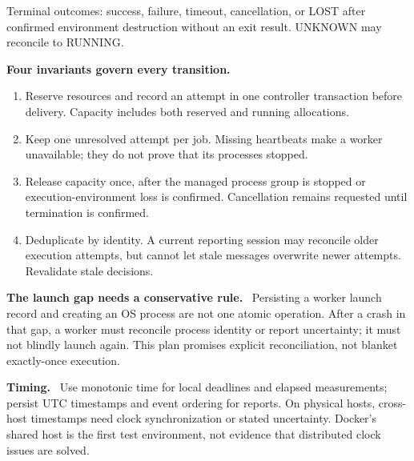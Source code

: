 \documentclass[10pt,letterpaper]{article}
\newcommand{\lead}[1]{\par\vspace{3pt}\textbf{#1}\ }
\begin{document}
\vspace{7pt}
\begin{center}
\end{center}
{\small\color{muted}Terminal outcomes: success, failure, timeout, cancellation, or LOST after
confirmed environment destruction without an exit result. UNKNOWN may reconcile to RUNNING.}

\lead{Four invariants govern every transition.}
\begin{enumerate}
\item Reserve resources and record an attempt in one controller transaction before delivery.
Capacity includes both reserved and running allocations.
\item Keep one unresolved attempt per job. Missing heartbeats make a worker unavailable;
they do not prove that its processes stopped.
\item Release capacity once, after the managed process group is stopped or execution-environment
loss is confirmed. Cancellation remains requested until termination is confirmed.
\item Deduplicate by identity. A current reporting session may reconcile older execution
attempts, but cannot let stale messages overwrite newer attempts. Revalidate stale decisions.
\end{enumerate}

\lead{The launch gap needs a conservative rule.} Persisting a worker launch record and
creating an OS process are not one atomic operation. After a crash in that gap, a worker
must reconcile process identity or report uncertainty; it must not blindly launch again.
This plan promises explicit reconciliation, not blanket exactly-once execution.

\lead{Timing.} Use monotonic time for local deadlines and elapsed measurements; persist
UTC timestamps and event ordering for reports. On physical hosts, cross-host timestamps
need clock synchronization or stated uncertainty. Docker's shared host is the first test
environment, not evidence that distributed clock issues are solved.
\end{document}

